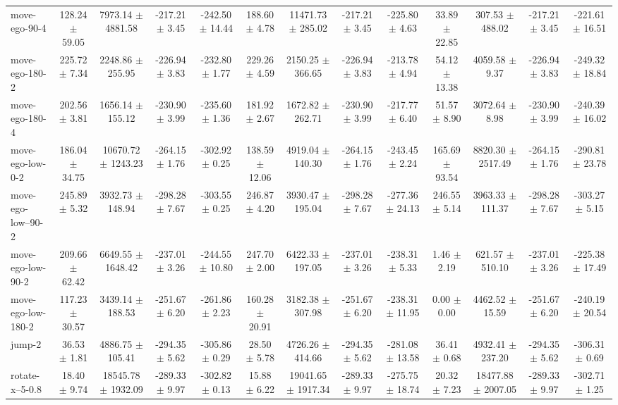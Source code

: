 \begin{tabular}{|lcccccccccccc|}
move-ego-90-4 & 128.24 $\pm$ 59.05 & 7973.14 $\pm$ 4881.58 & -217.21 $\pm$ 3.45 & -242.50 $\pm$ 14.44 & 188.60 $\pm$ 4.78 & 11471.73 $\pm$ 285.02 & -217.21 $\pm$ 3.45 & -225.80 $\pm$ 4.63 & 33.89 $\pm$ 22.85 & 307.53 $\pm$ 488.02 & -217.21 $\pm$ 3.45 & -221.61 $\pm$ 16.51 \\
move-ego-180-2 & 225.72 $\pm$ 7.34 & 2248.86 $\pm$ 255.95 & -226.94 $\pm$ 3.83 & -232.80 $\pm$ 1.77 & 229.26 $\pm$ 4.59 & 2150.25 $\pm$ 366.65 & -226.94 $\pm$ 3.83 & -213.78 $\pm$ 4.94 & 54.12 $\pm$ 13.38 & 4059.58 $\pm$ 9.37 & -226.94 $\pm$ 3.83 & -249.32 $\pm$ 18.84 \\
move-ego-180-4 & 202.56 $\pm$ 3.81 & 1656.14 $\pm$ 155.12 & -230.90 $\pm$ 3.99 & -235.60 $\pm$ 1.36 & 181.92 $\pm$ 2.67 & 1672.82 $\pm$ 262.71 & -230.90 $\pm$ 3.99 & -217.77 $\pm$ 6.40 & 51.57 $\pm$ 8.90 & 3072.64 $\pm$ 8.98 & -230.90 $\pm$ 3.99 & -240.39 $\pm$ 16.02 \\
move-ego-low-0-2 & 186.04 $\pm$ 34.75 & 10670.72 $\pm$ 1243.23 & -264.15 $\pm$ 1.76 & -302.92 $\pm$ 0.25 & 138.59 $\pm$ 12.06 & 4919.04 $\pm$ 140.30 & -264.15 $\pm$ 1.76 & -243.45 $\pm$ 2.24 & 165.69 $\pm$ 93.54 & 8820.30 $\pm$ 2517.49 & -264.15 $\pm$ 1.76 & -290.81 $\pm$ 23.78 \\
move-ego-low--90-2 & 245.89 $\pm$ 5.32 & 3932.73 $\pm$ 148.94 & -298.28 $\pm$ 7.67 & -303.55 $\pm$ 0.25 & 246.87 $\pm$ 4.20 & 3930.47 $\pm$ 195.04 & -298.28 $\pm$ 7.67 & -277.36 $\pm$ 24.13 & 246.55 $\pm$ 5.14 & 3963.33 $\pm$ 111.37 & -298.28 $\pm$ 7.67 & -303.27 $\pm$ 5.15 \\
move-ego-low-90-2 & 209.66 $\pm$ 62.42 & 6649.55 $\pm$ 1648.42 & -237.01 $\pm$ 3.26 & -244.55 $\pm$ 10.80 & 247.70 $\pm$ 2.00 & 6422.33 $\pm$ 197.05 & -237.01 $\pm$ 3.26 & -238.31 $\pm$ 5.33 & 1.46 $\pm$ 2.19 & 621.57 $\pm$ 510.10 & -237.01 $\pm$ 3.26 & -225.38 $\pm$ 17.49 \\
move-ego-low-180-2 & 117.23 $\pm$ 30.57 & 3439.14 $\pm$ 188.53 & -251.67 $\pm$ 6.20 & -261.86 $\pm$ 2.23 & 160.28 $\pm$ 20.91 & 3182.38 $\pm$ 307.98 & -251.67 $\pm$ 6.20 & -238.31 $\pm$ 11.95 & 0.00 $\pm$ 0.00 & 4462.52 $\pm$ 15.59 & -251.67 $\pm$ 6.20 & -240.19 $\pm$ 20.54 \\
jump-2 & 36.53 $\pm$ 1.81 & 4886.75 $\pm$ 105.41 & -294.35 $\pm$ 5.62 & -305.86 $\pm$ 0.29 & 28.50 $\pm$ 5.78 & 4726.26 $\pm$ 414.66 & -294.35 $\pm$ 5.62 & -281.08 $\pm$ 13.58 & 36.41 $\pm$ 0.68 & 4932.41 $\pm$ 237.20 & -294.35 $\pm$ 5.62 & -306.31 $\pm$ 0.69 \\
rotate-x--5-0.8 & 18.40 $\pm$ 9.74 & 18545.78 $\pm$ 1932.09 & -289.33 $\pm$ 9.97 & -302.82 $\pm$ 0.13 & 15.88 $\pm$ 6.22 & 19041.65 $\pm$ 1917.34 & -289.33 $\pm$ 9.97 & -275.75 $\pm$ 18.74 & 20.32 $\pm$ 7.23 & 18477.88 $\pm$ 2007.05 & -289.33 $\pm$ 9.97 & -302.71 $\pm$ 1.25 \\

\end{tabular}
